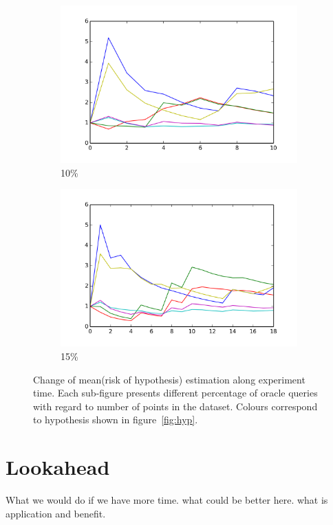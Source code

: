 \documentclass[12pt, a4paper, pdflatex, leqno]{report}
\begin{document}
\begin{figure}[ht]
    \begin{subfigure}{.5\linewidth}\centering
    \includegraphics[width=1.1\textwidth]{graphics/convergence10.png}
    \caption{10\%\label{fig:conv.ALL:10}}
  \end{subfigure}
  \begin{subfigure}{.5\linewidth}\centering
    \includegraphics[width=1.1\textwidth]{graphics/convergence15.png}
    \caption{15\%\label{fig:conv.ALL:15}}
  \end{subfigure}

  \caption{Change of mean(risk of hypothesis) estimation along experiment time. Each sub-figure presents different percentage of oracle queries with regard to number of points in the dataset. Colours correspond to hypothesis shown in figure~\ref{fig:hyp}.\label{fig:conv.ALL}}
\end{figure}


\section{Lookahead}
What we would do if we have more time. what could be better here. what is application and benefit.\\
\end{document}
